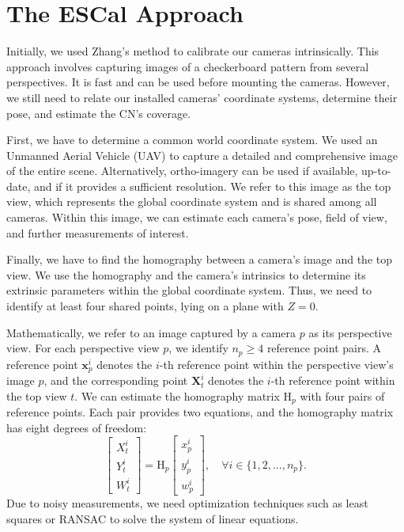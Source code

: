 \section{The ESCal Approach}
\label{sec:solution}
Initially, we used Zhang's \cite{zhang2000} method to calibrate our 
cameras intrinsically. This approach involves capturing images of 
a checkerboard pattern from several perspectives. It is  
fast and can be used before mounting the cameras. However, we still need 
to relate our installed cameras' coordinate systems, determine their 
pose, and estimate the CN's coverage.

First, we have to determine a common world coordinate system. 
We used an Unmanned Aerial Vehicle (UAV) to capture a detailed and comprehensive 
image of the entire scene. Alternatively, ortho-imagery can be used if 
available, up-to-date, and if it provides a sufficient resolution.
We refer to this image as the top view, which represents the global coordinate 
system and is shared among all cameras. Within this image, we can 
estimate each camera's pose, field of view, and further measurements of 
interest. 

Finally, we have to find the homography between a camera's image and the top view. 
We use the homography and the camera's intrinsics to determine its extrinsic 
parameters within the global coordinate system. Thus, we need to identify 
at least four shared points, lying on a plane 
with $Z=0$.

Mathematically, we  refer to an image captured by a camera $p$ 
as its perspective view. For each perspective view $p$, we identify
$n_{p} \geq 4$ reference point pairs. A reference point 
$\mathbf{x}_p^i$ denotes the $i$-th reference point within the perspective 
view's image $p$, and the corresponding point $\mathbf{X}_{t}^i$ denotes 
the $i$-th reference point within the top view $t$. We can estimate 
the homography matrix $\mathrm{H}_p$ with four pairs of reference points. 
Each pair provides two equations, and the homography matrix has eight 
degrees of freedom:
\begin{equation}
\begin{bmatrix}
	X_t^i \\ Y_t^i \\ W_t^i
\end{bmatrix}
= 
\mathrm{H}_p
\begin{bmatrix}
	x_p^i \\ y_p^i \\ w_p^i 
\end{bmatrix}, \quad \forall i \in \{1, 2, ..., n_p\}.
\end{equation}
Due to noisy measurements, we need optimization techniques such as least 
squares or RANSAC to solve the system of linear equations.


